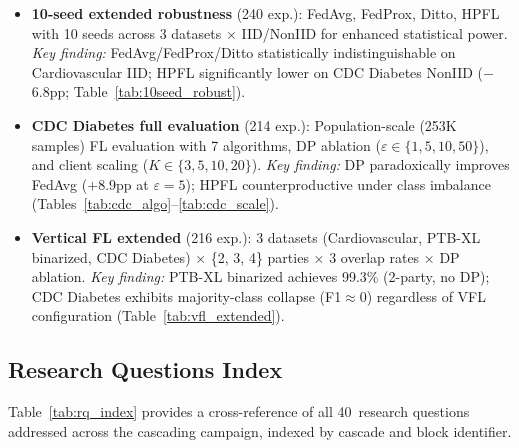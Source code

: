 \documentclass[conference,a4paper]{IEEEtran}
\begin{document}
\begin{itemize}
    \item \textbf{10-seed extended robustness} (240 exp.): FedAvg, FedProx, Ditto, HPFL with 10 seeds across 3 datasets $\times$ IID/NonIID for enhanced statistical power. \textit{Key finding:} FedAvg/FedProx/Ditto statistically indistinguishable on Cardiovascular IID; HPFL significantly lower on CDC Diabetes NonIID ($-$6.8pp; Table~\ref{tab:10seed_robust}).
    \item \textbf{CDC Diabetes full evaluation} (214 exp.): Population-scale (253K samples) FL evaluation with 7 algorithms, DP ablation ($\varepsilon{\in}\{1, 5, 10, 50\}$), and client scaling ($K{\in}\{3, 5, 10, 20\}$). \textit{Key finding:} DP paradoxically improves FedAvg ($+$8.9pp at $\varepsilon{=}5$); HPFL counterproductive under class imbalance (Tables~\ref{tab:cdc_algo}--\ref{tab:cdc_scale}).
    \item \textbf{Vertical FL extended} (216 exp.): 3 datasets (Cardiovascular, PTB-XL binarized, CDC Diabetes) $\times$ \{2, 3, 4\} parties $\times$ 3 overlap rates $\times$ DP ablation. \textit{Key finding:} PTB-XL binarized achieves 99.3\% (2-party, no DP); CDC Diabetes exhibits majority-class collapse (F1$\approx$0) regardless of VFL configuration (Table~\ref{tab:vfl_extended}).
\end{itemize}

\subsection{Research Questions Index}

Table~\ref{tab:rq_index} provides a cross-reference of all 40~research questions addressed across the cascading campaign, indexed by cascade and block identifier.
\end{document}
